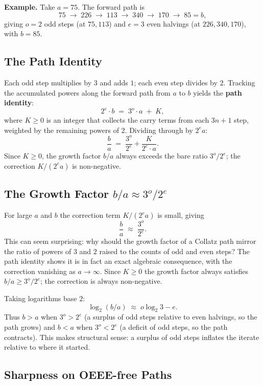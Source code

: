 \documentclass[11pt]{article}
\begin{document}
\noindent\textbf{Example.} Take $a = 75$.  The forward path is
\[
  75 \;\to\; 226 \;\to\; 113 \;\to\; 340 \;\to\; 170 \;\to\; 85 = b,
\]
giving $o = 2$ odd steps (at $75, 113$) and $e = 3$ even halvings
(at $226, 340, 170$), with $b = 85$.

\subsection{The Path Identity}

Each odd step multiplies by $3$ and adds $1$; each even step divides by $2$.
Tracking the accumulated powers along the forward path from $a$ to $b$ yields
the \textbf{path identity}:
\[
  2^e \cdot b \;=\; 3^o \cdot a \;+\; K,
\]
where $K \geq 0$ is an integer that collects the carry terms from each
$3n+1$ step, weighted by the remaining powers of $2$.  Dividing through by
$2^e a$:
\[
  \frac{b}{a} \;=\; \frac{3^o}{2^e} + \frac{K}{2^e \cdot a}.
\]
Since $K \geq 0$, the growth factor $b/a$ always exceeds the bare ratio
$3^o/2^e$; the correction $K/(2^e a)$ is non-negative.

\subsection{The Growth Factor $b/a \approx 3^o/2^e$}
\label{sec:approx}

For large $a$ and $b$ the correction term $K/(2^e a)$ is small, giving
\[
  \frac{b}{a} \;\approx\; \frac{3^o}{2^e}.
\]
This can seem surprising: why should the growth factor of a Collatz path
mirror the ratio of powers of $3$ and $2$ raised to the counts of odd
and even steps?  The path identity shows it is in fact an exact algebraic
consequence, with the correction vanishing as $a \to \infty$.  Since
$K \geq 0$ the growth factor always satisfies $b/a \geq 3^o/2^e$; the
correction is always non-negative.

Taking logarithms base $2$:
\[
  \log_2(b/a) \;\approx\; o\log_2 3 - e.
\]
Thus $b > a$ when $3^o > 2^e$ (a surplus of odd steps relative to
even halvings, so the path grows) and $b < a$ when $3^o < 2^e$ (a
deficit of odd steps, so the path contracts).  This makes structural
sense: a surplus of odd steps inflates the iterate relative to where
it started.

\subsection{Sharpness on OEEE-free Paths}
\end{document}
